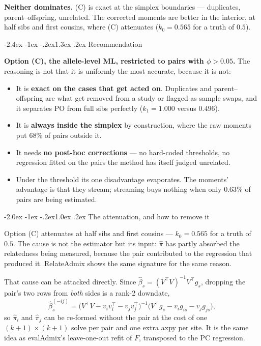 \documentclass[10pt,a4paper]{article}
\makeatletter
\renewcommand\section{\@startsection{section}{1}{\z@}%
  {-2.4ex \@plus -1ex \@minus -.2ex}{1.3ex \@plus.2ex}%
  {\normalfont\large\bfseries\color{hdr}}}
\renewcommand\subsection{\@startsection{subsection}{2}{\z@}%
  {-2.0ex \@plus -1ex \@minus -.2ex}{1.0ex \@plus.2ex}%
  {\normalfont\normalsize\bfseries\color{hdr}}}
\newenvironment{tightitem}{%
  \begin{itemize}\setlength{\itemsep}{1pt}\setlength{\parskip}{0pt}%
  \setlength{\topsep}{3pt}\setlength{\parsep}{0pt}}{\end{itemize}}
\makeatother
\begin{document}
\noindent
\textbf{Neither dominates.} (C) is exact at the simplex boundaries --- duplicates, parent--offspring,
unrelated. The corrected moments are better in the interior, at half sibs and first cousins, where (C)
attenuates ($k_0=0.565$ for a truth of $0.5$).

\section{Recommendation}

\textbf{Option (C), the allele-level ML, restricted to pairs with $\phi>0.05$.} The reasoning is not that it
is uniformly the most accurate, because it is not:

\begin{tightitem}
  \item It is \textbf{exact on the cases that get acted on}. Duplicates and parent--offspring are what get
  removed from a study or flagged as sample swaps, and it separates PO from full sibs perfectly
  ($k_1=1.000$ versus $0.496$).
  \item It is \textbf{always inside the simplex} by construction, where the raw moments put 68\% of pairs
  outside it.
  \item It needs \textbf{no post-hoc corrections} --- no hard-coded thresholds, no regression fitted on the
  pairs the method has itself judged unrelated.
  \item Under the threshold its one disadvantage evaporates. The moments' advantage is that they stream;
  streaming buys nothing when only $0.63\%$ of pairs are being estimated.
\end{tightitem}

\subsection{The attenuation, and how to remove it}

Option (C) attenuates at half sibs and first cousins --- $k_0=0.565$ for a truth of $0.5$. The cause is not
the estimator but its input: $\hat\pi$ has partly absorbed the relatedness being measured, because the pair
contributed to the regression that produced it. RelateAdmix shows the same signature for the same reason.

That cause can be attacked directly. Since
$\hat\beta_s=(V^{\!\top}V)^{-1}V^{\!\top}g_s$, dropping the pair's two rows from \emph{both} sides is a
rank-2 downdate,
\begin{equation*}
\hat\beta^{(-ij)}_s=\big(V^{\!\top}V-v_iv_i^{\!\top}-v_jv_j^{\!\top}\big)^{-1}
\big(V^{\!\top}g_s-v_i g_{is}-v_j g_{js}\big),
\end{equation*}
so $\hat\pi_i$ and $\hat\pi_j$ can be re-formed without the pair at the cost of one
$(k{+}1)\times(k{+}1)$ solve per pair and one extra axpy per site. It is the same idea as evalAdmix's
leave-one-out refit of $F$, transposed to the PC regression.
\end{document}
